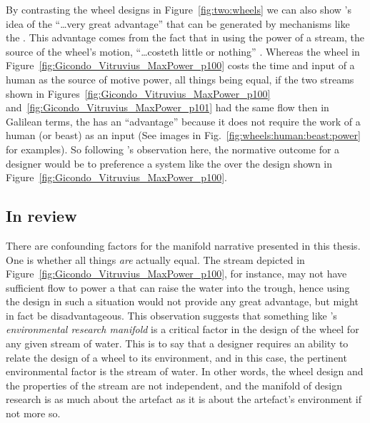 \documentclass[a4paper, 12pt]{article}
\begin{document}
By contrasting the wheel designs in Figure~\ref{fig:two:wheels} we can also show \citeauthor{galilei_mechanics_1665}'s idea of the ``\dots very great advantage'' that can be generated by mechanisms like the \SE. This advantage comes from the fact that in using the power of a stream, the source of the wheel's motion, ``\dots costeth little or nothing'' \citep[p.~4]{galilei_mechanics_1665}. Whereas the wheel in Figure~\ref{fig:Gicondo_Vitruvius_MaxPower_p100} costs the time and input of a human as the source of motive power, all things being equal, if the two streams shown in Figures~\ref{fig:Gicondo_Vitruvius_MaxPower_p100} and~\ref{fig:Gicondo_Vitruvius_MaxPower_p101} had the same flow then in Galilean terms, the \SEs has an ``advantage'' because it does not require the work of a human  (or beast) as an input (See images in Fig.~\ref{fig:wheels:human:beast:power} for examples). So following \citeauthor{galilei_mechanics_1665}'s observation here, the normative outcome for a designer would be to preference a system like the \SEs over the design shown in Figure~\ref{fig:Gicondo_Vitruvius_MaxPower_p100}.

\subsection{In review}

There are confounding factors for the manifold narrative presented in this thesis. One is whether all things \textit{are} actually equal. The stream depicted in Figure~\ref{fig:Gicondo_Vitruvius_MaxPower_p100}, for instance, may not have sufficient flow to power a \SE that can raise the water into the trough, hence using the \SEs design in such a situation would not provide any great advantage, but might in fact be disadvantageous. This observation suggests that something like \citeauthor{busbea_responsive_2019}'s \textit{environmental research manifold} is a critical factor in the design of the wheel for any given stream of water. This is to say that a designer requires an ability to relate the design of a wheel to its environment, and in this case, the pertinent environmental factor is the stream of water. In other words, the wheel design and the properties of the stream are not independent, and the manifold of design research is as much about the artefact as it is about the artefact's environment if not more so. 


\end{document}
